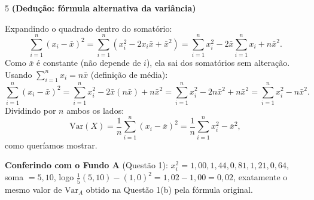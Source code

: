 \documentclass[11pt]{article}
\begin{document}
\begin{questao}{5} \textbf{(Dedução: fórmula alternativa da variância)}
\begin{solucao}
Expandindo o quadrado dentro do somatório:
$$
\sum_{i=1}^n (x_i-\bar x)^2 = \sum_{i=1}^n \left(x_i^2 - 2x_i\bar x + \bar x^2\right)
= \sum_{i=1}^n x_i^2 - 2\bar x\sum_{i=1}^n x_i + n\bar x^2.
$$
Como $\bar x$ é constante (não depende de $i$), ela sai dos somatórios sem alteração. Usando
$\sum_{i=1}^n x_i = n\bar x$ (definição de média):
$$
\sum_{i=1}^n (x_i-\bar x)^2 = \sum_{i=1}^n x_i^2 - 2\bar x (n\bar x) + n\bar x^2
= \sum_{i=1}^n x_i^2 - 2n\bar x^2 + n\bar x^2 = \sum_{i=1}^n x_i^2 - n\bar x^2.
$$
Dividindo por $n$ ambos os lados:
$$
\mathrm{Var}(X) = \frac{1}{n}\sum_{i=1}^n (x_i-\bar x)^2 = \frac{1}{n}\sum_{i=1}^n x_i^2 - \bar x^2,
$$
como queríamos mostrar.

\textbf{Conferindo com o Fundo A} (Questão 1): $x_i^2 = 1{,}00, 1{,}44, 0{,}81, 1{,}21, 0{,}64$,
soma $=5{,}10$, logo $\frac{1}{5}(5{,}10) - (1{,}0)^2 = 1{,}02 - 1{,}00 = 0{,}02$, exatamente o
mesmo valor de $\mathrm{Var}_A$ obtido na Questão 1(b) pela fórmula original.
\end{solucao}
\end{questao}
\end{document}
